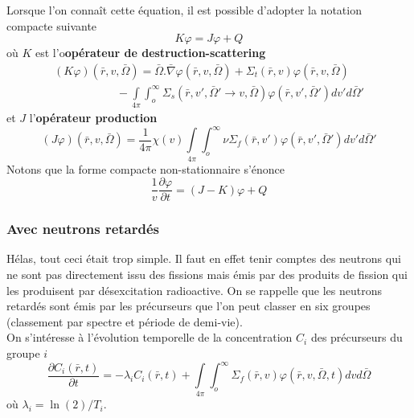 Lorsque l'on connaît cette équation, il est possible d'adopter la notation compacte suivante
\begin{equation}
K\varphi  = J\varphi  + Q
\end{equation}
où $K$ est l'o\textbf{opérateur de destruction-scattering}
\begin{equation}
\begin{array}{l}
(K\varphi )(\bar r,v,\bar \Omega ) = \bar \Omega .\bar \nabla \varphi (\bar r,v,\bar \Omega ) + {\Sigma _t}(\bar r,v)\varphi (\bar r,v,\bar \Omega )\\
\quad \quad \quad \quad \quad \;\; - \int\limits_{4\pi }    \int_o^\infty     {\Sigma _s}(\bar r,v',\bar \Omega ' \to v,\bar \Omega )\varphi (\bar r,v',\bar \Omega ')dv'd\bar \Omega '
\end{array}
\end{equation}
et $J$ l'\textbf{opérateur production}
\begin{equation}
(J\varphi )(\bar r,v,\bar \Omega ) = \frac{1}{{4\pi }}\chi (v)\int\limits_{4\pi }    \int_o^\infty     \nu {\Sigma _f}(\bar r,v')\varphi (\bar r,v',\bar \Omega ')dv'd\bar \Omega '
\end{equation}
Notons que la forme compacte non-stationnaire s'énonce
\begin{equation}
\frac{1}{v}\frac{{\partial \varphi }}{{\partial t}} = (J - K)\varphi  + Q
\end{equation}


\subsubsection{Avec neutrons retardés}
Hélas, tout ceci était trop simple. Il faut en effet tenir comptes des neutrons qui ne sont pas 
directement issu des fissions mais émis par des produits de fission qui les produisent par 
désexcitation radioactive. On se rappelle que les neutrons retardés sont émis par les précurseurs 
que l'on peut classer en six groupes (classement par spectre et période de demi-vie).\\

On s'intéresse à l'évolution temporelle de la concentration $C_i$ des précurseurs du groupe $i$
\begin{equation}
\frac{{\partial {C_i}(\bar r,t)}}{{\partial t}} = - {\lambda _i}{C_i}(\bar r,t)
 + \int\limits_{4\pi }    \int_o^\infty     {\Sigma _f}(\bar r,v)\varphi (\bar r,v,\bar \Omega ,t)dvd\bar \Omega 
\end{equation}
où $\lambda_i = \ln(2)/T_i$.\\

